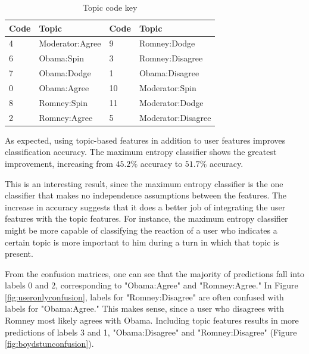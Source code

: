 \begin{table}[H]
\begin{centering}
\begin{tabular}{ l | l | l | l }
 Code & Topic & Code & Topic \\
\hline
4 & Moderator:Agree & 9 & Romney:Dodge \\
6 & Obama:Spin & 3 & Romney:Disagree \\
7 & Obama:Dodge & 1 & Obama:Disagree \\
0 & Obama:Agree & 10 & Moderator:Spin \\
8 & Romney:Spin & 11 & Moderator:Dodge \\
2 & Romney:Agree & 5 & Moderator:Disagree \\
\end{tabular}
\caption{Topic code key}
\end{centering}
\end{table}

As expected, using topic-based features in addition to user features improves classification accuracy. The maximum entropy classifier shows the greatest improvement, increasing from $45.2\%$ accuracy to $51.7\%$ accuracy.

This is an interesting result, since the maximum entropy classifier is the one classifier that makes no independence assumptions between the features. The increase in accuracy suggests that it does a better job of integrating the user features with the topic features. For instance, the maximum entropy classifier might be more capable of classifying the reaction of a user who indicates a certain topic is more important to him during a turn in which that topic is present.

From the confusion matrices, one can see that the majority of predictions fall into labels 0 and 2, corresponding to "Obama:Agree" and "Romney:Agree." In Figure \ref{fig:useronlyconfusion}, labels for "Romney:Disagree" are often confused with labels for "Obama:Agree." This makes sense, since a user who disagrees with Romney most likely agrees with Obama. Including topic features results in more predictions of labels 3 and 1, "Obama:Disagree" and "Romney:Disagree" (Figure \ref{fig:boydstunconfusion}).